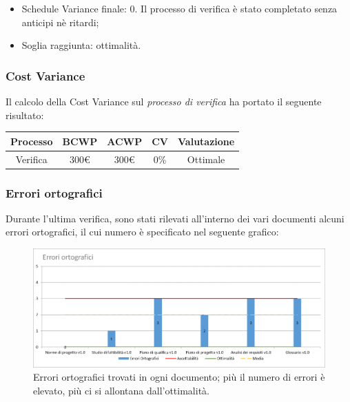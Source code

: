 \begin{itemize}
	\item Schedule Variance finale: 0. 
	Il processo di verifica è stato completato senza anticipi nè ritardi;
	
	\item Soglia raggiunta: ottimalità.
\end{itemize}


\subsubsection{Cost Variance}
Il calcolo della Cost Variance sul \emph{processo di verifica} ha portato il seguente risultato: 

{
	\renewcommand{\arraystretch}{2}
	\centering
	\begin{tabular}{| c | c | c | c | c |}
		\hline
		\textbf{Processo} & \textbf{BCWP} & \textbf{ACWP} & \textbf{CV} & \textbf{Valutazione} \\
		\hline
		Verifica & 300\euro & 300\euro & 0\% & Ottimale \\
		\hline
	\end{tabular}
	
}

\newpage

\subsubsection{Errori ortografici}
Durante l'ultima verifica, sono stati rilevati all'interno dei vari documenti alcuni errori ortografici, il cui numero è specificato nel seguente grafico:

\begin{figure}[h!]
	\centering
	\includegraphics[scale=0.6]{img/Grafici/Errori_orto.png}
	\caption{Errori ortografici trovati in ogni documento; più il numero di errori è elevato, più ci si allontana dall'ottimalità.}
	\label{fig:Errori_orto}
\end{figure}

